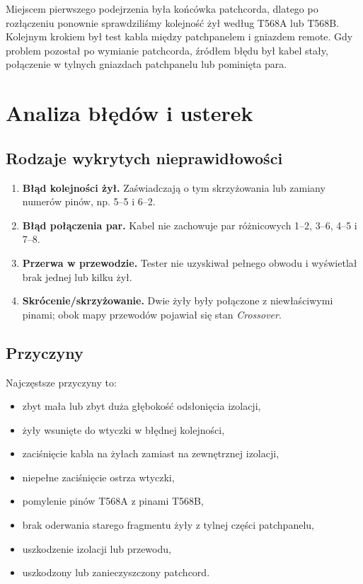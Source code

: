 \documentclass[12pt,a4paper]{article}
\begin{document}
Miejscem pierwszego podejrzenia była końcówka patchcorda, dlatego po rozłączeniu ponownie sprawdziliśmy kolejność żył według T568A lub T568B. Kolejnym krokiem był test kabla między patchpanelem i gniazdem remote. Gdy problem pozostał po wymianie patchcorda, źródłem błędu był kabel stały, połączenie w tylnych gniazdach patchpanelu lub pominięta para.

\section{Analiza błędów i usterek}
\subsection{Rodzaje wykrytych nieprawidłowości}
\begin{enumerate}
  \item \textbf{Błąd kolejności żył.} Zaświadczają o tym skrzyżowania lub zamiany numerów pinów, np. 5--5 i 6--2.
  \item \textbf{Błąd połączenia par.} Kabel nie zachowuje par różnicowych 1--2, 3--6, 4--5 i 7--8.
  \item \textbf{Przerwa w przewodzie.} Tester nie uzyskiwał pełnego obwodu i wyświetlał brak jednej lub kilku żył.
  \item \textbf{Skrócenie/skrzyżowanie.} Dwie żyły były połączone z niewłaściwymi pinami; obok mapy przewodów pojawiał się stan \textit{Crossover}.
\end{enumerate}

\subsection{Przyczyny}
Najczęstsze przyczyny to:
\begin{itemize}
  \item zbyt mała lub zbyt duża głębokość odsłonięcia izolacji,
  \item żyły wsunięte do wtyczki w błędnej kolejności,
  \item zaciśnięcie kabla na żyłach zamiast na zewnętrznej izolacji,
  \item niepełne zaciśnięcie ostrza wtyczki,
  \item pomylenie pinów T568A z pinami T568B,
  \item brak oderwania starego fragmentu żyły z tylnej części patchpanelu,
  \item uszkodzenie izolacji lub przewodu,
  \item uszkodzony lub zanieczyszczony patchcord.
\end{itemize}
\end{document}
